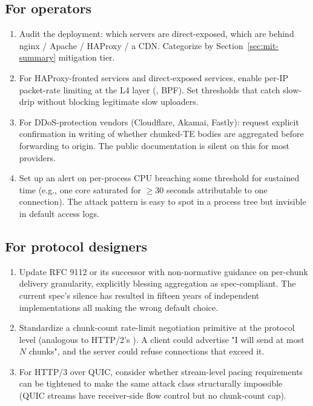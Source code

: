 \subsection{For operators}
\label{sec:rec-op}

\begin{enumerate}
  \item Audit the deployment: which servers are direct-exposed,
    which are behind nginx / Apache / HAProxy / a CDN. Categorize
    by Section~\ref{sec:mit-summary} mitigation tier.
  \item For HAProxy-fronted services and direct-exposed services,
    enable per-IP packet-rate limiting at the L4 layer
    (, BPF). Set thresholds that catch slow-drip
    without blocking legitimate slow uploaders.
  \item For DDoS-protection vendors (Cloudflare, Akamai, Fastly):
    request explicit confirmation in writing of whether chunked-TE
    bodies are aggregated before forwarding to origin. The
    public documentation is silent on this for most providers.
  \item Set up an alert on per-process CPU breaching some
    threshold for sustained time (e.g., one core saturated for
    \(\geq 30\) seconds attributable to one connection). The
    attack pattern is easy to spot in a process tree but invisible
    in default access logs.
\end{enumerate}

\subsection{For protocol designers}
\label{sec:rec-spec}

\begin{enumerate}
  \item Update RFC 9112 or its successor with non-normative
    guidance on per-chunk delivery granularity, explicitly
    blessing aggregation as spec-compliant. The current spec's
    silence has resulted in fifteen years of independent
    implementations all making the wrong default choice.
  \item Standardize a chunk-count rate-limit negotiation
    primitive at the protocol level (analogous to HTTP/2's
    ). A client could
    advertise "I will send at most $N$ chunks", and the server
    could refuse connections that exceed it.
  \item For HTTP/3 over QUIC, consider whether stream-level pacing
    requirements can be tightened to make the same attack class
    structurally impossible (QUIC streams have receiver-side
    flow control but no chunk-count cap).
\end{enumerate}

